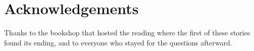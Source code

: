 \chapter{Acknowledgements}
Thanks to the bookshop that hosted the reading where the first of
these stories found its ending, and to everyone who stayed for the
questions afterward.
